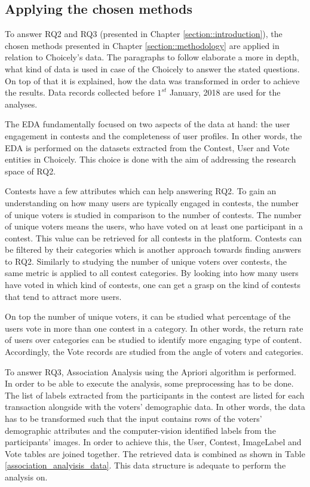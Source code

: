     \subsection{Applying the chosen methods}
    To answer RQ2 and RQ3 (presented in Chapter \ref{section::introduction}), the chosen methods presented in Chapter \ref{section::methodology} are applied in relation to Choicely's data. The paragraphs to follow elaborate a more in depth, what kind of data is used in case of the Choicely to answer the stated questions. On top of that it is explained, how the data was transformed in order to achieve the results. Data records collected before $1^{st}$ January, 2018 are used for the analyses. 

    The EDA fundamentally focused on two aspects of the data at hand: the user engagement in contests and the completeness of user profiles. In other words, the EDA is performed on the datasets extracted from the Contest, User and Vote entities in Choicely. This choice is done with the aim of addressing the research space of RQ2.  
    
    Contests have a few attributes which can help answering RQ2. To gain an understanding on how many users are typically engaged in contests, the number of unique voters is studied in comparison to the number of contests. The number of unique voters means the users, who have voted on at least one participant in a contest. This value can be retrieved for all contests in the platform. Contests can be filtered by their categories which is another approach towards finding answers to RQ2. Similarly to studying the number of unique voters over contests, the same metric is applied to all contest categories. By looking into how many users have voted in which kind of contests, one can get a grasp on the kind of contests that tend to attract more users.

    On top the number of unique voters, it can be studied what percentage of the users vote in more than one contest in a category. In other words, the return rate of users over categories can be studied to identify more engaging type of content. Accordingly, the Vote records are studied from the angle of voters and categories.

    To answer RQ3, Association Analysis using the Apriori algorithm is performed. In order to be able to execute the analysis, some preprocessing has to be done. The list of labels extracted from the participants in the contest are listed for each transaction alongside with the voters' demographic data. In other words, the data has to be transformed such that the input contains rows of the voters' demographic attributes and the computer-vision identified labels from the participants' images. In order to achieve this, the User, Contest, ImageLabel and Vote tables are joined together. The retrieved data is combined as shown in Table \ref{association_analyisis_data}. This data structure is adequate to perform the analysis on.

